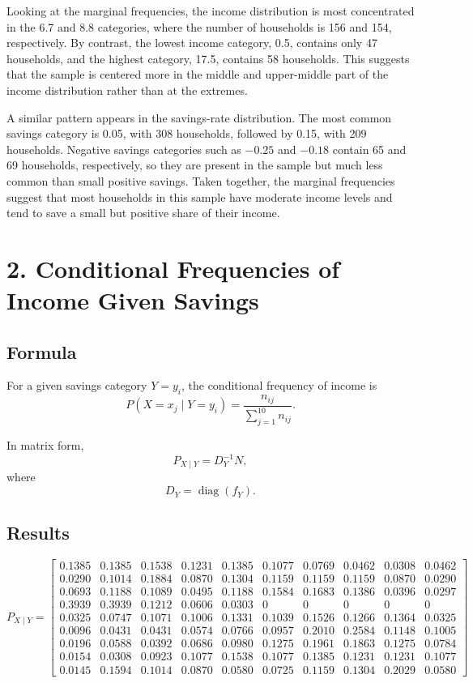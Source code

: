 \documentclass[12pt]{article}
\newcommand{\x}{40pt}
\begin{document}
Looking at the marginal frequencies, the income distribution is most concentrated in the 6.7 and 8.8 categories, where the number of households is 156 and 154, respectively. By contrast, the lowest income category, 0.5, contains only 47 households, and the highest category, 17.5, contains 58 households. This suggests that the sample is centered more in the middle and upper-middle part of the income distribution rather than at the extremes.

A similar pattern appears in the savings-rate distribution. The most common savings category is 0.05, with 308 households, followed by 0.15, with 209 households. Negative savings categories such as $-0.25$ and $-0.18$ contain 65 and 69 households, respectively, so they are present in the sample but much less common than small positive savings. Taken together, the marginal frequencies suggest that most households in this sample have moderate income levels and tend to save a small but positive share of their income.




\vspace{\x}
\section*{2. Conditional Frequencies of Income Given Savings}

\subsection*{Formula}

For a given savings category $Y=y_i$, the conditional frequency of income is
\[
P(X=x_j\mid Y=y_i)=\frac{n_{ij}}{\sum_{j=1}^{10} n_{ij}}.
\]

In matrix form,
\[
P_{X\mid Y}=D_Y^{-1}N,
\]
where
\[
D_Y=\operatorname{diag}(f_Y).
\]

\subsection*{Results}

\[
P_{X\mid Y}=
\begin{bmatrix}
0.1385&0.1385&0.1538&0.1231&0.1385&0.1077&0.0769&0.0462&0.0308&0.0462\\
0.0290&0.1014&0.1884&0.0870&0.1304&0.1159&0.1159&0.1159&0.0870&0.0290\\
0.0693&0.1188&0.1089&0.0495&0.1188&0.1584&0.1683&0.1386&0.0396&0.0297\\
0.3939&0.3939&0.1212&0.0606&0.0303&0&0&0&0&0\\
0.0325&0.0747&0.1071&0.1006&0.1331&0.1039&0.1526&0.1266&0.1364&0.0325\\
0.0096&0.0431&0.0431&0.0574&0.0766&0.0957&0.2010&0.2584&0.1148&0.1005\\
0.0196&0.0588&0.0392&0.0686&0.0980&0.1275&0.1961&0.1863&0.1275&0.0784\\
0.0154&0.0308&0.0923&0.1077&0.1538&0.1077&0.1385&0.1231&0.1231&0.1077\\
0.0145&0.1594&0.1014&0.0870&0.0580&0.0725&0.1159&0.1304&0.2029&0.0580
\end{bmatrix}
\]
\end{document}

